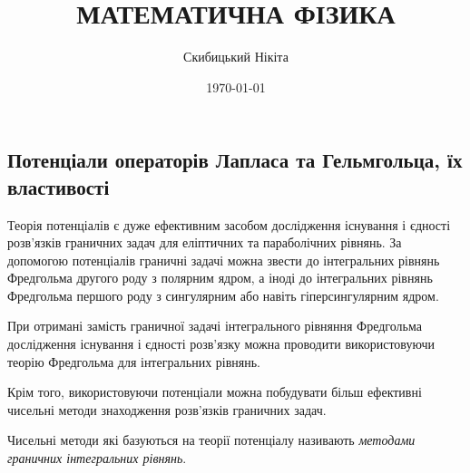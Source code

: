 

\title{{\Huge МАТЕМАТИЧНА ФІЗИКА}}
\author{Скибицький Нікіта}
\date{\today}
 




\tableofcontents

\setcounter{section}{4}
\setcounter{subsection}{7}

\subsection{Потенціали операторів Лапласа та Гельмгольца, їх властивості}

Теорія потенціалів є дуже ефективним засобом дослідження існування і єдності розв'язків граничних задач для еліптичних та параболічних рівнянь. За допомогою потенціалів граничні задачі можна звести до інтегральних рівнянь Фредгольма другого роду з полярним ядром, а іноді до інтегральних рівнянь Фредгольма першого роду з сингулярним або навіть гіперсингулярним ядром. \medskip

При отримані замість граничної задачі інтегрального рівняння Фредгольма дослідження існування і єдності розв'язку можна проводити використовуючи теорію Фредгольма для інтегральних рівнянь. \medskip

Крім того, використовуючи потенціали можна побудувати більш ефективні чисельні методи знаходження розв'язків граничних задач.

\begin{definition}
	Чисельні методи які базуються на теорії потенціалу називають \textit{методами граничних інтегральних рівнянь}.
\end{definition}

